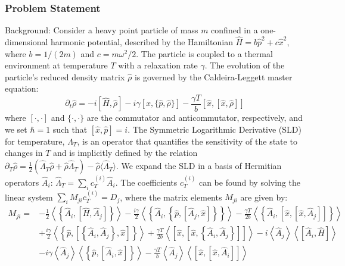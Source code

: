 \documentclass[10pt]{article}
\begin{document}
\subsubsection*{Problem Statement}
Background:
Consider a heavy point particle of mass $m$ confined in a one-dimensional harmonic potential, described by the Hamiltonian $\hat{H} = b\hat{p}^2 + c\hat{x}^2$, where $b=1/(2m)$ and $c=m\omega^2/2$. The particle is coupled to a thermal environment at temperature $T$ with a relaxation rate $\gamma$. The evolution of the particle's reduced density matrix $\hat{\rho}$ is governed by the Caldeira-Leggett master equation:
\begin{equation*}
\partial_t \hat\rho = -i [\hat H, \hat\rho] - i\gamma [\hat x,\{\hat p,\hat\rho\}]-\frac{\gamma T}{b}[ \hat x,[\hat x,\hat \rho]]
\end{equation*}
where $[\cdot,\cdot]$ and $\{\cdot,\cdot\}$ are the commutator and anticommutator, respectively, and we set $\hbar=1$ such that $[\hat{x}, \hat{p}] = i$. The Symmetric Logarithmic Derivative (SLD) for temperature, $\hat{\Lambda}_T$, is an operator that quantifies the sensitivity of the state to changes in $T$ and is implicitly defined by the relation $\partial_T \hat \rho = \frac{1}{2} ( \hat\Lambda_T \hat\rho + \hat\rho \hat\Lambda_T ) - \hat\rho\langle \hat \Lambda_T \rangle$. We expand the SLD in a basis of Hermitian operators $\hat{A}_i$: $\hat{\Lambda}_T = \sum_i c_T^{(i)} \hat{A}_i$. The coefficients $c_T^{(i)}$ can be found by solving the linear system $\sum_i M_{ji} c_T^{(i)} = D_j$, where the matrix elements $M_{ji}$ are given by:
\begin{align*}
M_{ji} = &-\tfrac{1}{2} \left\langle \left\{ \hat{A}_i , \left[ \hat{H}, \hat{A}_j \right] \right\}\right\rangle 
- \tfrac{i\gamma}{2} \left\langle \left\{ \hat{A}_i, \left\{ \hat{p} ,\left[ \hat{A}_j, \hat{x} \right] \right\} \right\} \right\rangle
- \tfrac{\gamma T}{2 b} \left\langle \left\{ \hat{A}_i, \left[ \hat{x}, \left[ \hat{x}, \hat{A}_j \right] \right] \right\} \right\rangle \\
& + \tfrac{i \gamma}{2} \left\langle \left\{ \hat{p}, \left[ \left\{ \hat{A}_i, \hat{A}_j\right\}, \hat{x} \right] \right\}\right\rangle
+ \tfrac{\gamma T}{2 b} \left\langle \left[ \hat{x}, \left[ \hat x, \left\{ \hat{A}_i, \hat{A}_j \right\}\right] \right] \right\rangle 
- i \left \langle \hat{A}_j \right\rangle \left\langle \left[ \hat{A}_i, \hat{H} \right] \right\rangle \\
& - i \gamma \left\langle \hat{A}_j \right\rangle \left\langle \left\{ \hat{p}, \left[ \hat{A}_i, \hat{x} \right] \right\} \right\rangle 
- \tfrac{\gamma T}{b} \left\langle \hat{A}_j \right\rangle \left\langle \left[ \hat x, \left[ \hat{x}, \hat{A}_i \right] \right] \right\rangle
\end{align*}
\end{document}

